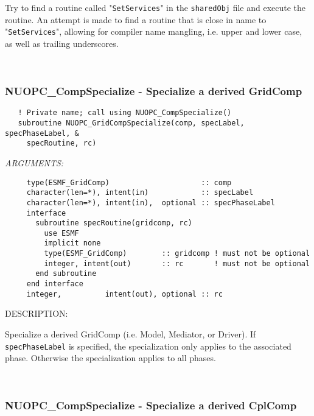      Try to find a routine called "{\tt SetServices}" in the {\tt sharedObj} file
     and execute the routine. An attempt is made to find a routine that
     is close in name to "{\tt SetServices}", allowing for compiler name
     mangling, i.e. upper and lower case, as well as trailing underscores. 
 
\mbox{}\hrulefill\ 
 
\subsubsection [NUOPC\_CompSpecialize] {NUOPC\_CompSpecialize - Specialize a derived GridComp}


  
\begin{verbatim}   ! Private name; call using NUOPC_CompSpecialize()
   subroutine NUOPC_GridCompSpecialize(comp, specLabel, specPhaseLabel, &
     specRoutine, rc)\end{verbatim}{\em ARGUMENTS:}
\begin{verbatim}     type(ESMF_GridComp)                     :: comp
     character(len=*), intent(in)            :: specLabel
     character(len=*), intent(in),  optional :: specPhaseLabel
     interface
       subroutine specRoutine(gridcomp, rc)
         use ESMF
         implicit none
         type(ESMF_GridComp)        :: gridcomp ! must not be optional
         integer, intent(out)       :: rc       ! must not be optional
       end subroutine
     end interface
     integer,          intent(out), optional :: rc \end{verbatim}
{\sf DESCRIPTION:\\ }


   Specialize a derived GridComp (i.e. Model, Mediator, or Driver). If
   {\tt specPhaseLabel} is specified, the specialization only applies to
   the associated phase. Otherwise the specialization applies to all phases. 
 
\mbox{}\hrulefill\ 
 
\subsubsection [NUOPC\_CompSpecialize] {NUOPC\_CompSpecialize - Specialize a derived CplComp}


